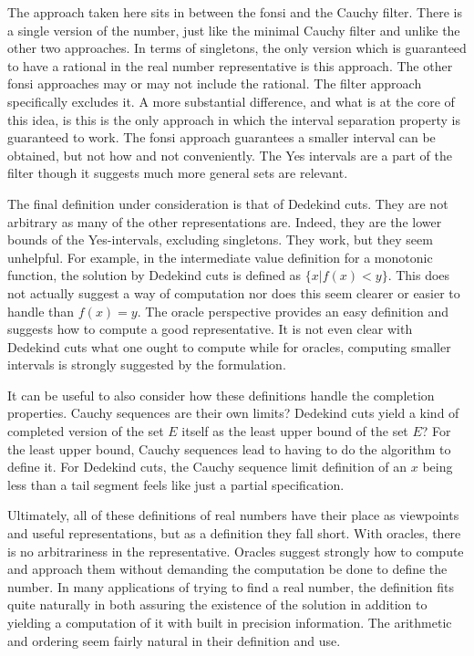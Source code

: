 \documentclass[12pt]{article}
\theoremstyle{remark}
\begin{document}
The approach taken here sits in between the fonsi and the Cauchy filter. There is a single version of the number, just like the minimal Cauchy filter and unlike the other two approaches. In terms of singletons, the only version which is guaranteed to have a rational in the real number representative is this approach. The other fonsi approaches may or may not include the rational. The filter approach specifically excludes it. A more substantial difference, and what is at the core of this idea, is this is the only approach in which the interval separation property is guaranteed to work. The fonsi approach guarantees a smaller interval can be obtained, but not how and not conveniently. The Yes intervals are a part of the filter though it suggests much more general sets are relevant. 

The final definition under consideration is that of Dedekind cuts. They are not arbitrary as many of the other representations are. Indeed, they are the lower bounds of the Yes-intervals, excluding singletons. They work, but they seem unhelpful. For example, in the intermediate value definition for a monotonic function, the solution by Dedekind cuts is defined as $\{x | f(x) < y\}$. This does not actually suggest a way of computation nor does this seem clearer or easier to handle than $f(x) = y$. The oracle perspective provides an easy definition and suggests how to compute a good representative. It is not even clear with Dedekind cuts what one ought to compute while for oracles, computing smaller intervals is strongly suggested by the formulation. 

It can be useful to also consider how these definitions handle the completion properties. Cauchy sequences are their own limits? Dedekind cuts yield a kind of completed version of the set $E$ itself as the least upper bound of the set $E$? For the least upper bound, Cauchy sequences lead to having to do the algorithm to define it. For Dedekind cuts, the Cauchy sequence limit definition of an $x$ being less than a tail segment feels like just a partial specification. 

Ultimately, all of these definitions of real numbers have their place as viewpoints and useful representations, but as a definition they fall short. With oracles, there is no arbitrariness in the representative. Oracles suggest strongly how to compute and approach them without demanding the computation be done to define the number. In many applications of trying to find a real number, the definition fits quite naturally in both assuring the existence of the solution in addition to yielding a computation of it with built in precision information. The arithmetic and ordering seem fairly natural in their definition and use. 
\end{document}
